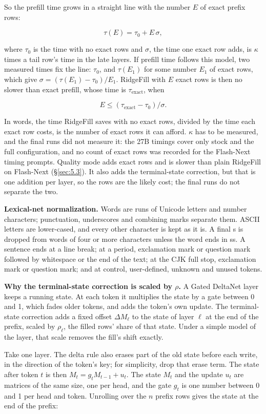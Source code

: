 \documentclass[11pt]{article}
\begin{document}
So the prefill time grows in a straight line with the number $E$ of exact prefix rows:

\[\tau(E) = \tau_0 + E\,\sigma ,\]

where $\tau_0$ is the time with no exact rows and $\sigma$, the time one exact row adds, is $\kappa$ times a tail row's time in the late layers. If prefill time follows this model, two measured times fix the line: $\tau_0$, and $\tau(E_1)$ for some number $E_1$ of exact rows, which give $\sigma = (\tau(E_1) - \tau_0)/E_1$. RidgeFill with $E$ exact rows is then no slower than exact prefill, whose time is $\tau_\text{exact}$, when

\[E \le (\tau_\text{exact} - \tau_0)/\sigma .\]

In words, the time RidgeFill saves with no exact rows, divided by the time each exact row costs, is the number of exact rows it can afford. $\kappa$ has to be measured, and the final runs did not measure it: the 27B timings cover only stock and the full configuration, and no count of exact rows was recorded for the Flash-Next timing prompts. Quality mode adds exact rows and is slower than plain RidgeFill on Flash-Next (\S\ref{sec:5.3}). It also adds the terminal-state correction, but that is one addition per layer, so the rows are the likely cost; the final runs do not separate the two.

\textbf{Lexical-net normalization.} Words are runs of Unicode letters and number characters; punctuation, underscores and combining marks separate them. ASCII letters are lower-cased, and every other character is kept as it is. A final s is dropped from words of four or more characters unless the word ends in ss. A sentence ends at a line break; at a period, exclamation mark or question mark followed by whitespace or the end of the text; at the CJK full stop, exclamation mark or question mark; and at control, user-defined, unknown and unused tokens.

\textbf{Why the terminal-state correction is scaled by $\rho$.} A Gated DeltaNet layer keeps a running state. At each token it multiplies the state by a gate between 0 and 1, which fades older tokens, and adds the token's own update. The terminal-state correction adds a fixed offset $\Delta M_\ell$ to the state of layer $\ell$ at the end of the prefix, scaled by $\rho_\ell$, the filled rows' share of that state. Under a simple model of the layer, that scale removes the fill's shift exactly.

Take one layer. The delta rule also erases part of the old state before each write, in the direction of the token's key; for simplicity, drop that erase term. The state after token $t$ is then $M_t = g_t M_{t-1} + u_t$. The state $M_t$ and the update $u_t$ are matrices of the same size, one per head, and the gate $g_t$ is one number between 0 and 1 per head and token. Unrolling over the $n$ prefix rows gives the state at the end of the prefix:
\end{document}
